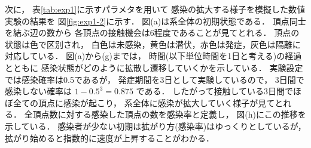 \documentclass[10pt,oneside]{scrartcl}
\begin{document}
\begin{figure*}%
  \centering
\end{figure*}

\begin{figure}[htbp]
  \centering
  \setcounter{GraphPage}{8}
  \setcounter{GraphPage}{13}
  \setcounter{GraphPage}{18}
  \setcounter{GraphPage}{23}
  \setcounter{GraphPage}{28}
  \setcounter{GraphPage}{33}
\end{figure}

次に，
表\ref{tab:exp1}に示すパラメタを用いて
感染の拡大する様子を模擬した数値実験の結果を
図\ref{fig:exp1-2}に示す．
図(a)は系全体の初期状態である．
頂点同士を結ぶ辺の数から
各頂点の接触機会は6程度であることが見てとれる．
頂点の状態は色で区別され，
白色は未感染，黄色は潜伏，赤色は発症，灰色は隔離に
対応している．
図(a)から(g)までは，
時間(以下単位時間を1日と考える)の経過とともに
感染状態がどのように拡散し遷移していくかを示している．
実験設定では感染確率は0.5であるが，
発症期間を3日として実験しているので，
3日間で感染しない確率は \(1-0.5^3=0.875\) である．
したがって接触している3日間でほぼ全ての頂点に感染が起こり，
系全体に感染が拡大していく様子が見てとれる．
全頂点数に対する感染した頂点の数を感染率と定義し，
図(h)にこの推移を示している．
感染者が少ない初期は拡がり方(感染率)はゆっくりとしているが，
拡がり始めると指数的に速度が上昇することがわかる．
\end{document}
